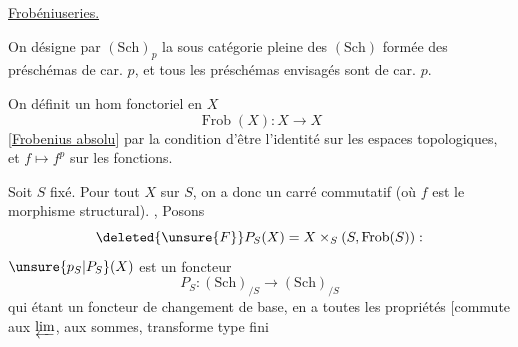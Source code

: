 \uline{Frobéniuseries.}

On désigne par $(\mathrm{Sch})_p$  la sous catégorie pleine des $(\mathrm{Sch})$
formée des préschémas de car. $p$, et tous les préschémas
envisagés sont de car. $p$.

On définit un hom fonctoriel en $X$
\[
\operatorname{Frob}(X):X\longrightarrow X
\]
[\uline{Frobenius absolu}] par la condition d'être l'identité
sur les espaces topologiques, et $f\mapsto f^p$ sur les
fonctions.

Soit $S$ fixé. Pour tout $X$ sur $S$, on a donc
un carré commutatif
(où $f$ est le morphisme structural). , Posons
\[
\deleted{\unsure{F}}P_S(X)=X\times_S(S,\operatorname{Frob}(S)):
\]
$\unsure{p_S|P_S}(X)$ est un foncteur
\[
P_S:(\mathrm{Sch})_{/S}\longrightarrow(\mathrm{Sch})_{/S}
\]
qui étant un foncteur de changement de base, en
a toutes les propriétés [commute aux
$\varprojlim$, aux sommes, transforme type fini
